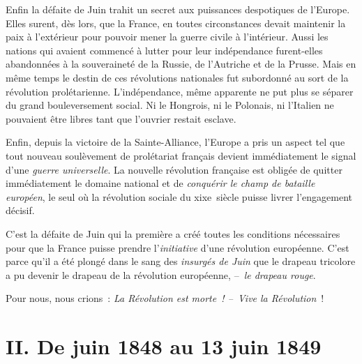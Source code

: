 \documentclass[twoside]{book} %
\newcommand\chapteropen{} %
\newcommand\chapterclose{} %
\begin{document}
Enfin la défaite de Juin trahit un secret aux puissances despotiques de l’Europe. Elles surent, dès lors, que la France, en toutes circonstances devait maintenir la paix à l’extérieur pour pouvoir mener la guerre civile à l’intérieur. Aussi les nations qui avaient commencé à lutter pour leur indépendance furent-elles abandonnées à la souveraineté de la Russie, de l’Autriche et de la Prusse. Mais en même temps le destin de ces révolutions nationales fut subordonné au sort de la révolution prolétarienne. L’indépendance, même apparente ne put plus se séparer du grand bouleversement social. Ni le Hongrois, ni le Polonais, ni l’Italien ne pouvaient être libres tant que l’ouvrier restait esclave.\par
Enfin, depuis la victoire de la Sainte-Alliance, l’Europe a pris un aspect tel que tout nouveau soulèvement de prolétariat français devient immédiatement le signal d’une \emph{guerre universelle}. La nouvelle révolution française est obligée de quitter immédiatement le domaine national et de \emph{conquérir le champ de bataille européen}, le seul où la révolution sociale du xixe siècle puisse livrer l’engagement décisif.\par
C’est la défaite de Juin qui la première a créé toutes les conditions nécessaires pour que la France puisse prendre l’\emph{initiative} d’une révolution européenne. C’est parce qu’il a été plongé dans le sang des \emph{insurgés de Juin} que le drapeau tricolore a pu devenir le drapeau de la révolution européenne, – \emph{le drapeau rouge}.\par
Pour nous, nous crions : \emph{La Révolution est morte ! – Vive la Révolution} !
\chapterclose


\chapteropen

\chapter[{II. De juin 1848 au 13 juin 1849}]{II. De juin 1848 au 13 juin 1849}
\renewcommand{\leftmark}{II. De juin 1848 au 13 juin 1849}
\end{document}

